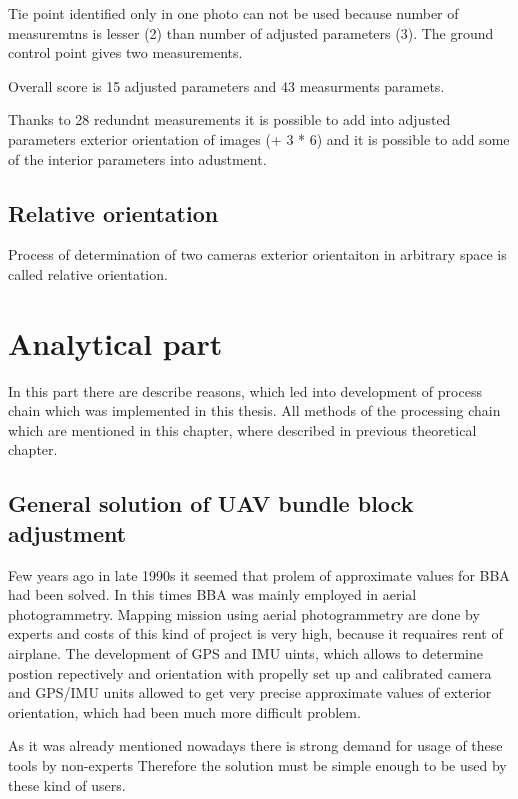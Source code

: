\documentclass[a4paper,12pt]{report}
\begin{document}
Tie point identified only in one photo can not be used because number of measuremtns is lesser (2) than number of adjusted parameters (3).
The ground control point gives two measurements.


Overall score is 15 adjusted parameters and 43 measurments paramets.

Thanks to 28 redundnt measurements it is possible to add into adjusted parameters exterior orientation of images (+ 3 * 6) and it is possible to
add some of the interior parameters into adustment.  

\section{Relative orientation}

Process of determination of two cameras exterior orientaiton in arbitrary space is called relative orientation.


\chapter{Analytical part}

In this part there are describe reasons, which led into development of process chain which was implemented in 
this thesis. All methods of the processing chain which are mentioned in this chapter, where described in 
previous theoretical chapter.


\section{General solution of UAV bundle block adjustment}


Few years ago in late 1990s it seemed that prolem of approximate values for BBA had been solved. 
In this times BBA was mainly employed in aerial photogrammetry. Mapping mission using aerial 
photogrammetry are done by experts and costs of this kind of project is very high, because
it requaires rent of airplane. The development of GPS and IMU uints, which allows to determine 
postion repectively and orientation with propelly set up and calibrated camera and GPS/IMU 
units allowed to get very precise approximate values of exterior orientation, which had been
much more difficult problem.  
  
As it was already mentioned nowadays there is strong demand for usage of these tools by non-experts 
Therefore the solution must be simple enough to be used by these kind of users. 
\end{document}
